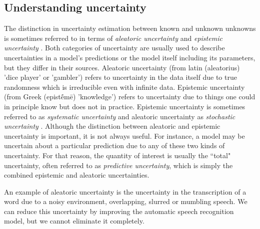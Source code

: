 \subsection{Understanding uncertainty}
% 
% 
%
The distinction in uncertainty estimation between known and unknown unknowns is sometimes referred to in terms of \textit{aleatoric uncertainty} and \textit{epistemic uncertainty} \cite{kendall_what_2017}. Both categories of uncertainty are usually used to describe uncertainties in a model's predictions or the model itself including its parameters, but they differ in their sources. 
Aleatoric uncertainty (from latin (aleatorius) 'dice player' or 'gambler') refers to uncertainty in the data itself due to true randomness which is irreducible even with infinite data. 
Epistemic uncertainty (from Greek (epistḗmē) 'knowledge') refers to uncertainty due to things one could in principle know but does not in practice. 
Epistemic uncertainty is sometimes referred to as \textit{systematic uncertainty} and aleatoric uncertainty as \textit{stochastic uncertainty} \cite{kendall_what_2017}. 
Although the distinction between aleatoric and epistemic uncertainty is important, it is not always useful. For instance, a model may be uncertain about a particular prediction due to any of these two kinds of uncertainty. For that reason, the quantity of interest is usually the ``total" uncertainty, often referred to as \textit{predictive uncertainty}, which is simply the combined epistemic and aleatoric uncertainties. 

An example of aleatoric uncertainty is the uncertainty in the transcription of a word due to a noisy environment, overlapping, slurred or mumbling speech. We can reduce this uncertainty by improving the automatic speech recognition model, but we cannot eliminate it completely. 

